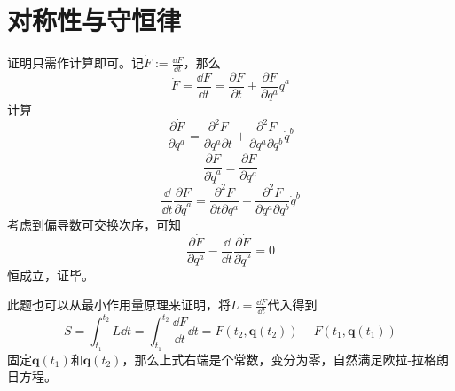 \chapter{对称性与守恒律}


\begin{solution}
	证明只需作计算即可。记\(\dot{F}:=\frac{\dd F}{\dd t}\)，那么
	\[\dot{F}=\frac{\dd F}{\dd t}=\frac{\partial F}{\partial t}+\frac{\partial F}{\partial q^a}\dot{q}^a\]
	计算
	\[\frac{\partial \dot{F}}{\partial q^a}=\frac{\partial^2 F}{\partial q^a\partial t}+\frac{\partial^2 F}{\partial q^a\partial q^b}\dot{q}^b\]
	\[\frac{\partial \dot{F}}{\partial \dot{q}^a}=\frac{\partial F}{\partial q^a}\]
	\[\frac{\dd}{\dd t}\frac{\partial \dot{F}}{\partial \dot{q}^a}=\frac{\partial^2 F}{\partial t\partial q^a}+\frac{\partial^2 F}{\partial q^a\partial q^b}\dot{q}^b\]
	考虑到偏导数可交换次序，可知
	\[\frac{\partial \dot{F}}{\partial q^a}-\frac{\dd}{\dd t}\frac{\partial \dot{F}}{\partial \dot{q}^a}=0\]
	恒成立，证毕。
	
	此题也可以从最小作用量原理来证明，将\(L=\frac{\dd F}{\dd t}\)代入得到
	\[S=\int_{t_1}^{t_2} L \dd t=\int_{t_1}^{t_2} \frac{\dd F}{\dd t} \dd t=F(t_2,\bm{q}(t_2))-F(t_1,\bm{q}(t_1))\]
	固定\(\bm{q}(t_1)\)和\(\bm{q}(t_2)\)，那么上式右端是个常数，变分为零，自然满足欧拉-拉格朗日方程。
\end{solution}




